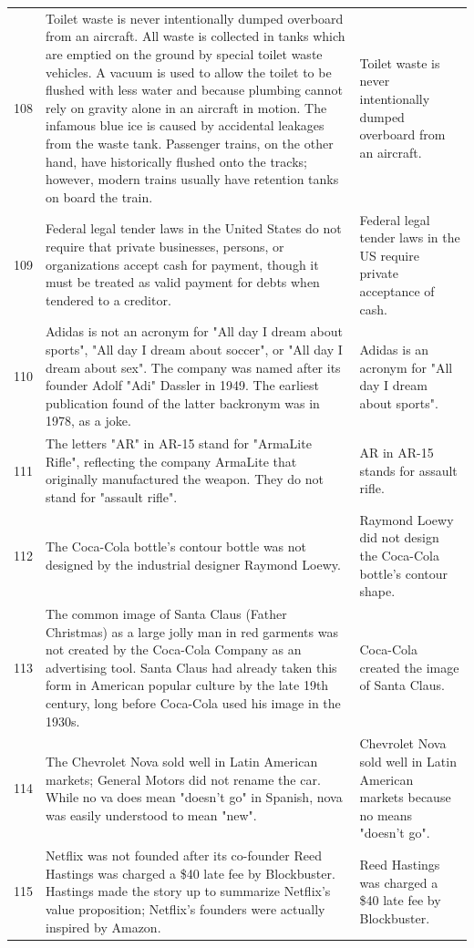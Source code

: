 \begin{tabular}{c|p{}|p{}}
108 & Toilet waste is never intentionally dumped overboard from an aircraft. All waste is collected in tanks which are emptied on the ground by special toilet waste vehicles. A vacuum is used to allow the toilet to be flushed with less water and because plumbing cannot rely on gravity alone in an aircraft in motion. The infamous blue ice is caused by accidental leakages from the waste tank. Passenger trains, on the other hand, have historically flushed onto the tracks; however, modern trains usually have retention tanks on board the train. & Toilet waste is never intentionally dumped overboard from an aircraft. \\
109 & Federal legal tender laws in the United States do not require that private businesses, persons, or organizations accept cash for payment, though it must be treated as valid payment for debts when tendered to a creditor. & Federal legal tender laws in the US require private acceptance of cash. \\
110 & Adidas is not an acronym for "All day I dream about sports", "All day I dream about soccer", or "All day I dream about sex". The company was named after its founder Adolf "Adi" Dassler in 1949. The earliest publication found of the latter backronym was in 1978, as a joke. & Adidas is an acronym for "All day I dream about sports". \\
111 & The letters "AR" in AR-15 stand for "ArmaLite Rifle", reflecting the company ArmaLite that originally manufactured the weapon. They do not stand for "assault rifle". & AR in AR-15 stands for assault rifle. \\
112 & The Coca-Cola bottle's contour bottle was not designed by the industrial designer Raymond Loewy. & Raymond Loewy did not design the Coca-Cola bottle's contour shape. \\
113 & The common image of Santa Claus (Father Christmas) as a large jolly man in red garments was not created by the Coca-Cola Company as an advertising tool. Santa Claus had already taken this form in American popular culture by the late 19th century, long before Coca-Cola used his image in the 1930s. & Coca-Cola created the image of Santa Claus. \\
114 & The Chevrolet Nova sold well in Latin American markets; General Motors did not rename the car. While no va does mean "doesn't go" in Spanish, nova was easily understood to mean "new". & Chevrolet Nova sold well in Latin American markets because no means "doesn't go". \\
115 & Netflix was not founded after its co-founder Reed Hastings was charged a \$40 late fee by Blockbuster. Hastings made the story up to summarize Netflix's value proposition; Netflix's founders were actually inspired by Amazon. & Reed Hastings was charged a \$40 late fee by Blockbuster. \\

\end{tabular}
